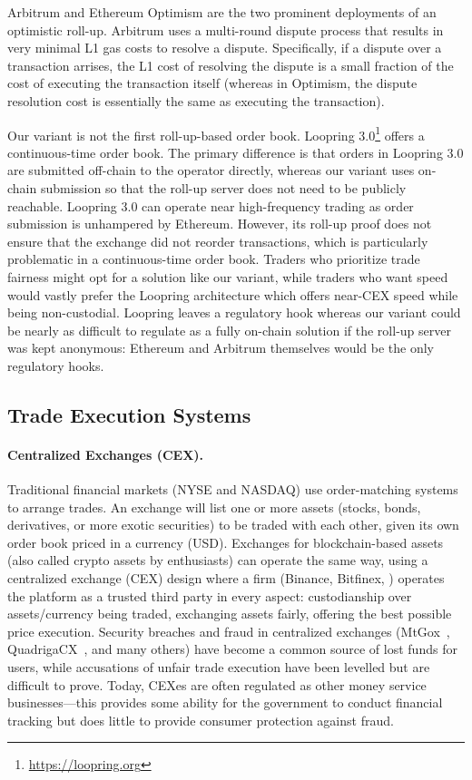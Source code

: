 Arbitrum and Ethereum Optimism are the two prominent deployments of an optimistic roll-up. Arbitrum  uses a multi-round dispute process that results in very minimal L1 gas costs to resolve a dispute. Specifically, if a dispute over a transaction arrises, the L1 cost of resolving the dispute is a small fraction of the cost of executing the transaction itself (whereas in Optimism, the dispute resolution cost is essentially the same as executing the transaction). 

Our \cm variant is not the first roll-up-based order book. Loopring 3.0\footnote{\url{https://loopring.org}} offers a continuous-time order book. The primary difference is that orders in Loopring 3.0 are submitted off-chain to the operator directly, whereas our variant uses on-chain submission so that the roll-up server does not need to be publicly reachable. Loopring 3.0 can operate near high-frequency trading as order submission is unhampered by Ethereum. However, its  roll-up proof does not ensure that the exchange did not reorder transactions, which is particularly problematic in a continuous-time order book. Traders who prioritize trade fairness might opt for a solution like our variant, while traders who want speed would vastly prefer the Loopring architecture which offers near-CEX speed while being non-custodial. Loopring leaves a regulatory hook whereas our variant could be nearly as difficult to regulate as a fully on-chain solution if the roll-up server was kept anonymous: Ethereum and Arbitrum themselves would be the only regulatory hooks.


\subsection{Trade Execution Systems}
\label{app:markets}

\paragraph{Centralized Exchanges (CEX).} Traditional financial markets (\eg NYSE and NASDAQ) use order-matching systems to arrange trades. An exchange will list one or more assets (stocks, bonds, derivatives, or more exotic securities) to be traded with each other, given its own order book priced in a currency (\eg USD). Exchanges for blockchain-based assets (also called crypto assets by enthusiasts) can operate the same way, using a centralized exchange (CEX) design where a firm (\eg Binance, Bitfinex, \etc) operates the platform as a trusted third party in every aspect: custodianship over assets/currency being traded, exchanging assets fairly, offering the best possible price execution. Security breaches and fraud in centralized exchanges  (\eg MtGox~\cite{TheHisto45:online}, QuadrigaCX~\cite{SEBIOrde83:online}, and many others) have become a common source of lost funds for users, while accusations of unfair trade execution have been levelled but are difficult to prove. Today, CEXes are often regulated as other money service businesses---this provides some ability for the government to conduct financial tracking but does little to provide consumer protection against fraud.

